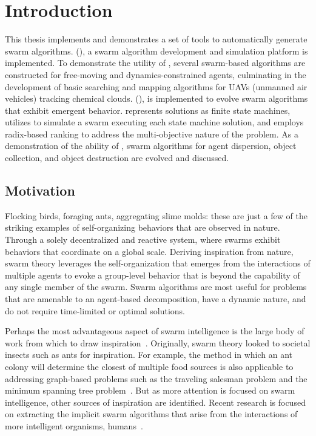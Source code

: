 \chapter{Introduction}
\label{ch:Introduction}

This thesis implements and demonstrates a set of tools to automatically generate swarm algorithms.  \SWEEP{} (\SWEEPexpbf{}), a swarm algorithm development and simulation platform is implemented.  To demonstrate the utility of \SWEEP{}, several swarm-based algorithms are constructed for free-moving and dynamics-constrained agents, culminating in the development of basic searching and mapping algorithms for UAVs (unmanned air vehicles) tracking chemical clouds.  \ECS{} (\ECSexp{}), is implemented to evolve swarm algorithms that exhibit emergent behavior.  \ECS{} represents solutions as finite state machines, utilizes \SWEEP{} to simulate a swarm executing each state machine solution, and employs radix-based ranking to address the multi-objective nature of the problem.  As a demonstration of the ability of \ECS{}, swarm algorithms for agent dispersion, object collection, and object destruction are evolved and discussed.

\section{Motivation}

Flocking birds, foraging ants, aggregating slime molds:  these are just a few of the striking examples of self-organizing behaviors that are observed in nature.  Through a solely decentralized and reactive system, where  swarms exhibit behaviors that coordinate on a global scale.  Deriving inspiration from nature, swarm theory leverages the self-organization that emerges from the interactions of multiple agents to evoke a group-level behavior that is beyond the capability of any single member of the swarm.  Swarm algorithms are most useful for problems that are amenable to an agent-based decomposition, have a dynamic nature, and do not require time-limited or optimal solutions.  

Perhaps the most advantageous aspect of swarm intelligence is the large body of work from which to draw inspiration~\cite{schechter:BoF}.  Originally, swarm theory looked to societal insects such as ants for inspiration.  For example, the method in which an ant colony will determine the closest of multiple food sources is also applicable to addressing graph-based problems such as the traveling salesman problem and the minimum spanning tree problem~\cite{bonabeau:SwarmIntelligence}.  But as more attention is focused on swarm intelligence, other sources of inspiration are identified.  Recent research is focused on extracting the implicit swarm algorithms that arise from the interactions of more intelligent organisms, \ie{} humans~\cite{palmer:HumanSwarm}.

